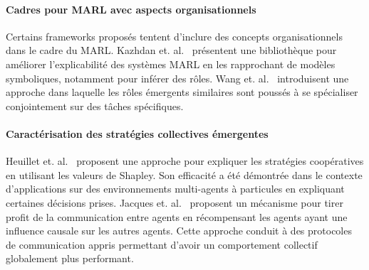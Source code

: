 \documentclass[demonstration]{jfsma}
\newcommand{\jp}[1]{\textbf{\color{red} JPJ: #1}}
\begin{document}
\paragraph{\textbf{Cadres pour MARL avec aspects organisationnels}}
%
Certains frameworks proposés tentent d'inclure des concepts organisationnels dans le cadre du MARL.
Kazhdan et. al.~\cite{Kazhdan2020} présentent une bibliothèque pour améliorer l'explicabilité des systèmes MARL en les rapprochant de modèles symboliques, notamment pour inférer des rôles.%
%
Wang et. al.~\cite{Wang2020} introduisent une approche dans laquelle les rôles émergents similaires sont poussés à se spécialiser conjointement sur des tâches spécifiques.
%
%

\paragraph{\textbf{Caractérisation des stratégies collectives émergentes}}
%
Heuillet et. al.~\cite{Heuillet2022} proposent une approche pour expliquer les stratégies coopératives en utilisant les valeurs de Shapley. Son efficacité a été démontrée dans le contexte d'applications sur des environnements multi-agents à particules en  expliquant certaines décisions prises. 
%
Jacques et. al.~\cite{Jaques2019} proposent un mécanisme pour tirer profit de la communication entre agents en récompensant les agents ayant une influence causale sur les autres agents. Cette approche conduit à des protocoles de communication appris permettant d'avoir un comportement collectif globalement plus performant.
\end{document}
